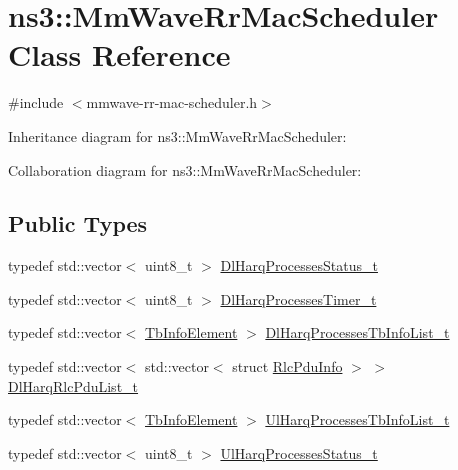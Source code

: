\hypertarget{classns3_1_1MmWaveRrMacScheduler}{}\section{ns3\+:\+:Mm\+Wave\+Rr\+Mac\+Scheduler Class Reference}
\label{classns3_1_1MmWaveRrMacScheduler}


{\ttfamily \#include $<$mmwave-\/rr-\/mac-\/scheduler.\+h$>$}



Inheritance diagram for ns3\+:\+:Mm\+Wave\+Rr\+Mac\+Scheduler\+:


Collaboration diagram for ns3\+:\+:Mm\+Wave\+Rr\+Mac\+Scheduler\+:
\subsection*{Public Types}
\begin{DoxyCompactItemize}
\item 
typedef std\+::vector$<$ uint8\+\_\+t $>$ \hyperlink{classns3_1_1MmWaveRrMacScheduler_a4edf77bbe56479bae12f56826a43b134}{Dl\+Harq\+Processes\+Status\+\_\+t}
\item 
typedef std\+::vector$<$ uint8\+\_\+t $>$ \hyperlink{classns3_1_1MmWaveRrMacScheduler_a750009728f27d7ea202009e12cf7f6de}{Dl\+Harq\+Processes\+Timer\+\_\+t}
\item 
typedef std\+::vector$<$ \hyperlink{structns3_1_1TbInfoElement}{Tb\+Info\+Element} $>$ \hyperlink{classns3_1_1MmWaveRrMacScheduler_a0ca6ed6e2801f50786257fc6ef19a907}{Dl\+Harq\+Processes\+Tb\+Info\+List\+\_\+t}
\item 
typedef std\+::vector$<$ std\+::vector$<$ struct \hyperlink{structns3_1_1RlcPduInfo}{Rlc\+Pdu\+Info} $>$ $>$ \hyperlink{classns3_1_1MmWaveRrMacScheduler_a1cd0bc1339970dc27da4f599233b911c}{Dl\+Harq\+Rlc\+Pdu\+List\+\_\+t}
\item 
typedef std\+::vector$<$ \hyperlink{structns3_1_1TbInfoElement}{Tb\+Info\+Element} $>$ \hyperlink{classns3_1_1MmWaveRrMacScheduler_a8be4bb7220253ad506048ff37620c7f1}{Ul\+Harq\+Processes\+Tb\+Info\+List\+\_\+t}
\item 
typedef std\+::vector$<$ uint8\+\_\+t $>$ \hyperlink{classns3_1_1MmWaveRrMacScheduler_aaa0e5dc99185dddba2e9617f3bc8b9bd}{Ul\+Harq\+Processes\+Status\+\_\+t}
\end{DoxyCompactItemize}

